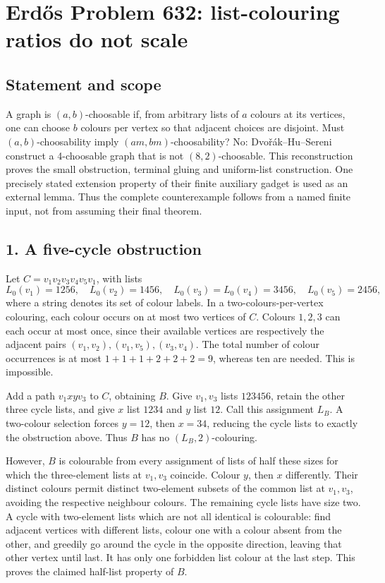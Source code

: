 \section{Erd\H{o}s Problem 632: list-colouring ratios do not scale}
\subsection*{Statement and scope}
A graph is $(a,b)$-choosable if, from arbitrary lists of $a$ colours at its vertices, one can choose $b$ colours per vertex so that adjacent choices are disjoint. Must $(a,b)$-choosability imply $(am,bm)$-choosability? No: Dvo\v r\'ak--Hu--Sereni construct a 4-choosable graph that is not $(8,2)$-choosable.
This reconstruction proves the small obstruction, terminal gluing and uniform-list construction. One precisely stated extension property of their finite auxiliary gadget is used as an external lemma. Thus the complete counterexample follows from a named finite input, not from assuming their final theorem.

\subsection*{1. A five-cycle obstruction}
Let $C=v_1v_2v_3v_4v_5v_1$, with lists
\[
 L_0(v_1)=1256,\quad L_0(v_2)=1456,\quad
 L_0(v_3)=L_0(v_4)=3456,\quad L_0(v_5)=2456,
\]
where a string denotes its set of colour labels. In a two-colours-per-vertex colouring, each colour occurs on at most two vertices of $C$. Colours $1,2,3$ can each occur at most once, since their available vertices are respectively the adjacent pairs $(v_1,v_2),(v_1,v_5),(v_3,v_4)$. The total number of colour occurrences is at most $1+1+1+2+2+2=9$, whereas ten are needed. This is impossible.

Add a path $v_1xyv_3$ to $C$, obtaining $B$. Give $v_1,v_3$ lists $123456$, retain the other three cycle lists, and give $x$ list $1234$ and $y$ list $12$. Call this assignment $L_B$. A two-colour selection forces $y=12$, then $x=34$, reducing the cycle lists to exactly the obstruction above. Thus $B$ has no $(L_B,2)$-colouring.

However, $B$ is colourable from every assignment of lists of half these sizes for which the three-element lists at $v_1,v_3$ coincide. Colour $y$, then $x$ differently. Their distinct colours permit distinct two-element subsets of the common list at $v_1,v_3$, avoiding the respective neighbour colours. The remaining cycle lists have size two. A cycle with two-element lists which are not all identical is colourable: find adjacent vertices with different lists, colour one with a colour absent from the other, and greedily go around the cycle in the opposite direction, leaving that other vertex until last. It has only one forbidden list colour at the last step. This proves the claimed half-list property of $B$.

